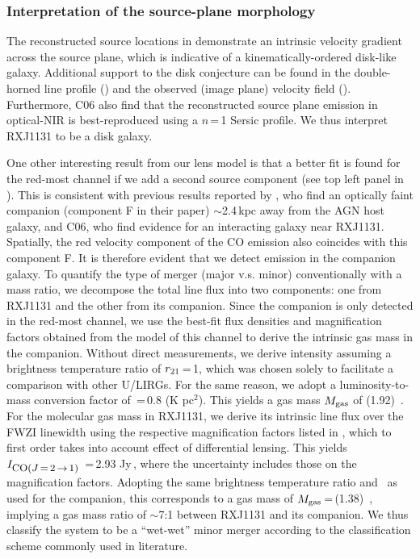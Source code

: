 \documentclass[]{emulateapj}
\begin{document}
\subsubsection{Interpretation of the source-plane morphology} \label{sec:caveat}
The reconstructed source locations in  demonstrate
an intrinsic velocity gradient across the source plane, which is
indicative of a kinematically-ordered disk-like galaxy. 
Additional support to the disk conjecture
can be found in the double-horned line profile ()
and the observed (image plane) velocity field (). Furthermore,
C06 also find that the reconstructed source plane emission in optical-NIR
is best-reproduced using a $n$\,=\,1 Sersic profile.
We thus interpret RXJ1131 to be a disk galaxy.

One other interesting result from our lens model is that a better fit is
found for the red-most channel if we add a second source component (see
top left panel in ). This is consistent with previous results
reported by \citet{Brewer08a}, who find an optically faint companion
(component F in their paper) $\sim$2.4\,kpc away from the AGN host galaxy,
and C06, who find evidence for an interacting galaxy near RXJ1131.
Spatially, the red velocity component of the CO emission
also coincides with this component F. It is therefore evident that we
detect \bco emission in the companion galaxy.
To quantify the type of merger (major v.s. minor) conventionally with a mass
ratio, we decompose the total line flux into two components:
one from RXJ1131 and the other from its companion.
Since the companion is only detected in the red-most channel, we
use the best-fit flux densities and magnification factors obtained
from the model of this channel to derive the intrinsic gas mass in the companion.
Without direct  measurements, we derive  intensity
assuming a brightness temperature ratio of $r_{\rm 21}$\,=\,1, which was chosen
solely to facilitate a comparison with other U/LIRGs. 
For the same reason, we adopt a luminosity-to-mass conversion factor of
\alphaco\,=\,0.8 (K \kms pc$^2$)\pmOne. This yields a gas mass
$M_{\rm gas}$ of (1.92)\, \Msun. 
For the molecular gas mass in RXJ1131, we derive
its intrinsic line flux over the FWZI linewidth
using the respective magnification
factors listed in , which to
first order takes into account effect of differential lensing.
This yields $I_{\small \mbox{CO($J$\,=\,2\,$\rightarrow$\,1) }}$\,=\,2.93 Jy\,\kms,
where the uncertainty includes those on
the magnification factors.
Adopting the same brightness temperature ratio and \alphaco\ as
used for the companion, this corresponds to a gas mass of
$M_{\rm gas}$\,=\,(1.38)\, \Msun,
implying a gas mass ratio of $\sim$7:1 between RXJ1131 and its companion.
We thus classify the system to be a ``wet-wet'' minor merger according to
the classification scheme commonly used in literature.
\end{document}
